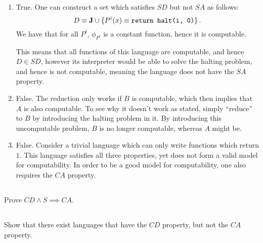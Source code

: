 \begin{solution}
\begin{enumerate}
	\item True.
	One can construct a set which satisfies \(SD\)
	but not \(SA\) as follows:
	\[
	D \equiv \mathbf{J} \cup \{P^i(x) \equiv \textnormal{\texttt{return halt(i, 0)}}\}\,.
	\]
	We have that for all \(P^i\), \(\phi_{P^i}\) is a constant function,
	hence it is computable.

	This means that all functions of this language are computable,
	and hence \(D \in SD\),
	however its interpreter would be able to solve the halting problem,
	and hence is not computable,
	meaning the language does not have the \(SA\) property.
	\item False.
	The reduction only works if \(B\) is computable,
	which then implies that \(A\) is also computable.
	To see why it doesn't work as stated,
	simply ``reduce'' to \(B\) by introducing the halting problem in it.
	By introducing this uncomputable problem, \(B\) is no longer computable,
	whereas \(A\) might be.
	\item False.
	Consider a trivial language
	which can only write functions which return \(1\).
	This language satisfies all three properties,
	yet does not form a valid model for computability.
	In order to be a good model for computability,
	one also requires the \(CA\) property.
\end{enumerate}
\end{solution}

\subsection{} %
Prove \(CD \land S \implies CA\).

\nosolution

\subsection{} %
Show that there exist languages that have the \(CD\) property,
but not the \(CA\) property.

\nosolution
